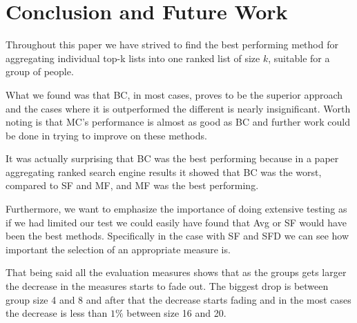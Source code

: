 \section{Conclusion and Future Work}\label{sec:conclusion}
Throughout this paper we have strived to find the best performing method for aggregating individual top-k lists into one ranked list of size $k$, suitable for a group of people.

What we found was that BC, in most cases, proves to be the superior approach and the cases where it is outperformed the different is nearly insignificant. Worth noting is that MC's performance is almost as good as BC and further work could be done in trying to improve on these methods. 

It was actually surprising that BC was the best performing because in a paper aggregating ranked search engine results it showed that BC was the worst, compared to SF and MF, and MF was the best performing\citep{rank:aggregation}. 

Furthermore, we want to emphasize the importance of doing extensive testing as if we had limited our test we could easily have found that Avg or SF would have been the best methods. Specifically in the case with SF and SFD we can see how important the selection of an appropriate measure is.

That being said all the evaluation measures shows that as the groups gets larger the decrease in the measures starts to fade out. The biggest drop is between group size 4 and 8 and after that the decrease starts fading and in the most cases the decrease is less than $1\%$ between size 16 and 20. 


